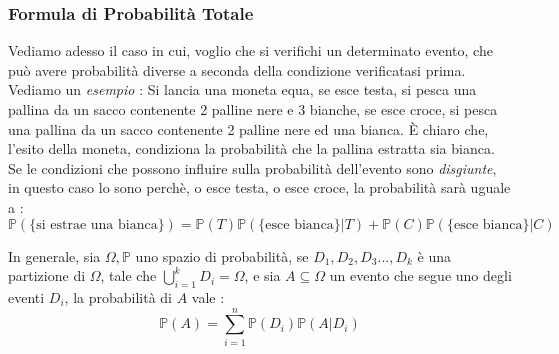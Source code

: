 \documentclass[12pt, letterpaper]{article}
\begin{document}
\subsubsection{Formula di Probabilità Totale}
Vediamo adesso il caso in cui, voglio che si verifichi un determinato evento, che può avere probabilità 
diverse a seconda della condizione verificatasi prima.\\ Vediamo un \textit{esempio} : Si lancia una moneta equa, 
se esce testa, si pesca una pallina da un sacco contenente 2 palline nere e 3 bianche, 
se esce croce, si pesca una pallina da un sacco contenente 2 palline nere ed una bianca. È chiaro che, l'esito 
della moneta, condiziona la probabilità che la pallina estratta sia bianca. Se le condizioni che possono 
influire sulla probabilità dell'evento sono \textit{disgiunte}, in questo caso lo sono perchè, o esce testa, 
o esce croce, la probabilità sarà uguale a :
\begin{equation}
    \mathbb{P}(\text{\{si estrae una bianca\}}) = \mathbb{P}(T)\mathbb{P}(\text{\{esce bianca\}}|T)+\mathbb{P}(C)\mathbb{P}(\text{\{esce bianca\}}|C)
\end{equation}

    In generale, sia \(\Omega, \mathbb{P}\) uno spazio di probabilità, se \(D_1,D_2,D_3...,D_k\) è una partizione 
    di \(\Omega\), tale che \(\displaystyle\bigcup_{i=1}^kD_i=\Omega\), e sia \(A\subseteq \Omega\) un evento che 
    segue uno degli eventi \(D_i\), la probabilità di \(A\) vale : \begin{equation}
        \mathbb{P}(A)=\sum_{i=1}^n\mathbb{P}(D_i)\mathbb{P}(A|D_i)
    \end{equation}

\begin{figure}[h]
\end{figure}
\end{document}
